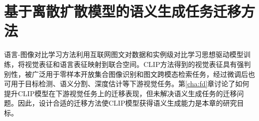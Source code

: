 \chapter{基于离散扩散模型的语义生成任务迁移方法}
\label{chap:ddcap}


语言-图像对比学习方法利用互联网图文对数据和实例级对比学习思想驱动模型训练，将视觉表征和语言表征映射到联合空间。CLIP方法得到的视觉表征具有强判别性，被广泛用于零样本开放集合图像识别和图文跨模态检索任务，经过微调后也可用于目标检测、语义分割、深度估计等下游视觉任务。第\ref{cha:fd}章讨论了如何提升CLIP模型在下游视觉任务上的迁移表现，但未解决语义生成任务的迁移问题。因此，设计合适的迁移方法使CLIP模型获得语义生成能力是本章的研究目标。

